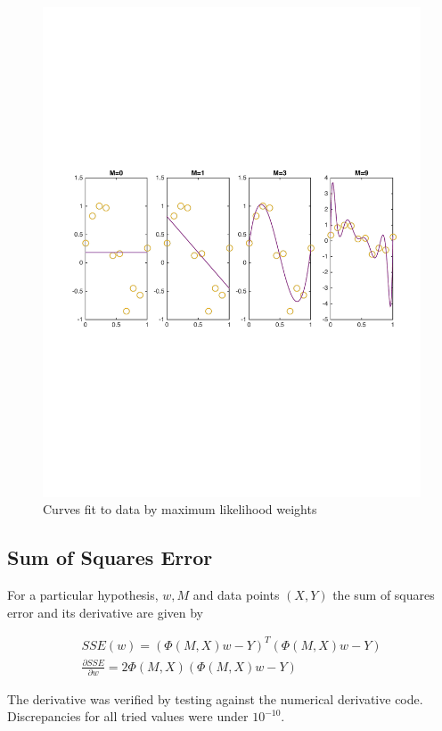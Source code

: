 \documentclass[10pt,twocolumn]{article}
\begin{document}
\begin{figure}[H]
\center
\includegraphics[scale =.45]{ML_weight.pdf}
\caption{Curves fit to data by maximum likelihood weights}
\end{figure}

\subsection*{ Sum of Squares Error}
For a particular hypothesis, $w, M $ and data points $(X, Y)$ the sum of squares error and its derivative are given by

\begin{align}
SSE(w) = (\Phi(M, X) w - Y)^T(\Phi(M, X) w - Y)\\
\frac{\partial SSE}{\partial w}= 2 \Phi(M,X)(\Phi(M,X)w -Y) 
\end{align}

The derivative was verified by testing against the numerical derivative code. Discrepancies for all tried values were under $10^{-10}$. 
\end{document}

